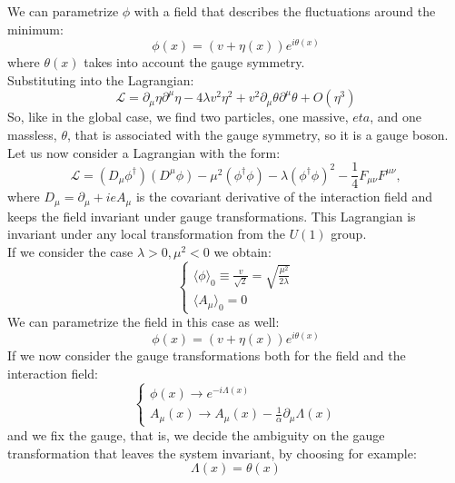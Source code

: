 We can parametrize $\phi$ with a field that describes the fluctuations around the minimum:
\begin{equation}
    \phi(x) = \left(v + \eta(x)\right)e^{i \theta(x)}
\end{equation}
where $\theta(x)$ takes into account the gauge symmetry.\\
Substituting into the Lagrangian:
\begin{equation}
    \mathcal{L}=\partial_{\mu}\eta\partial^{\mu}\eta - 4 \lambda v^2 \eta^2 + v^2 \partial_{\mu}\theta\partial^{\mu}\theta + O(\eta^3)
\end{equation}
So, like in the global case, we find two particles, one massive, $eta$, and one massless, $\theta$, that is associated with the gauge symmetry, so it is a gauge boson.\\
Let us now consider a Lagrangian with the form:
\begin{equation}
    \mathcal{L} = \left(D_{\mu}\phi^{\dagger}\right) \left(D^{\mu} \phi\right) - \mu^2\left(\phi^{\dagger} \phi\right) - \lambda \left(\phi^ {\dagger}\phi\right)^2 - \frac{1}{4} F_{\mu\nu}F^{\mu\nu},
\end{equation}
where $D_{\mu}= \partial_{\mu} + i e A_{\mu}$ is the covariant derivative of the interaction field and keeps the field invariant under gauge transformations.
This Lagrangian is invariant under any local transformation from the $U(1)$ group.\\
If we consider the case $\lambda >0, \mu^2<0$ we obtain:
\begin{equation}
    \begin{cases}
        \langle\phi\rangle_0 \equiv \frac{v}{\sqrt{2}} = \sqrt{\frac{\mu^2}{2\lambda}}\\
        \langle A_{\mu} \rangle_0 = 0
    \end{cases}
\end{equation}
We can parametrize the field in this case as well:
\begin{equation}
    \phi(x) = \left(v + \eta(x)\right)e^{i \theta(x)}
\end{equation}
If we now consider the gauge transformations both for the field and the interaction field:
\begin{equation}
    \begin{cases}
        \phi(x)\rightarrow e^{-i\Lambda(x)}\\
        A_{\mu}(x)\rightarrow A_{\mu}(x) - \frac{1}{\alpha}\partial_{\mu}\Lambda(x)
    \end{cases}
\end{equation}
and we fix the gauge, that is, we decide the ambiguity on the gauge transformation that leaves the system invariant, by choosing for example:
\begin{equation*}
    \Lambda(x) = \theta(x)
\end{equation*}

